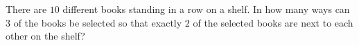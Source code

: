 There are $10$ different books standing in a row on a shelf. In how many ways can $3$ of the books be selected so that exactly $2$ of the selected books are next to each other on the shelf?

